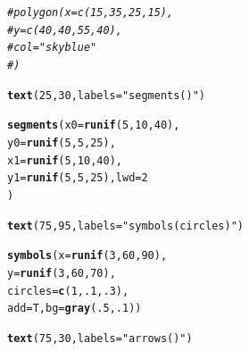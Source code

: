 \documentclass{tufte-book}\usepackage[]{graphicx}\usepackage[]{color}
\makeatletter
\newcommand{\hlnum}[1]{\textcolor[rgb]{0.686,0.059,0.569}{#1}}%
\newcommand{\hlstr}[1]{\textcolor[rgb]{0.192,0.494,0.8}{#1}}%
\newcommand{\hlcom}[1]{\textcolor[rgb]{0.678,0.584,0.686}{\textit{#1}}}%
\newcommand{\hlstd}[1]{\textcolor[rgb]{0.345,0.345,0.345}{#1}}%
\newcommand{\hlkwc}[1]{\textcolor[rgb]{0.333,0.667,0.333}{#1}}%
\newcommand{\hlkwd}[1]{\textcolor[rgb]{0.737,0.353,0.396}{\textbf{#1}}}%
\newenvironment{kframe}{%
 \def\at@end@of@kframe{}%
 \ifinner\ifhmode%
  \def\at@end@of@kframe{\end{minipage}}%
  \begin{minipage}{\columnwidth}%
 \fi\fi%
 \def\FrameCommand##1{\hskip\@totalleftmargin \hskip-\fboxsep
 \colorbox{shadecolor}{##1}\hskip-\fboxsep
     \hskip-\linewidth \hskip-\@totalleftmargin \hskip\columnwidth}%
 \MakeFramed {\advance\hsize-\width
   \@totalleftmargin\z@ \linewidth\hsize
   \@setminipage}}%
 {\par\unskip\endMakeFramed%
 \at@end@of@kframe}
\newenvironment{knitrout}{}{} %
\makeatother
\begin{document}
\begin{footnotesize}
\begin{marginfigure}
\begin{tiny}
\begin{knitrout}
\begin{kframe}
\begin{alltt}
\hlcom{# polygon(x = c(15, 35, 25, 15),}
\hlcom{#         y = c(40, 40, 55, 40),}
\hlcom{#         col = "skyblue"}
\hlcom{#         )}

\hlkwd{text}\hlstd{(}\hlnum{25}\hlstd{,} \hlnum{30}\hlstd{,} \hlkwc{labels} \hlstd{=} \hlstr{"segments()"}\hlstd{)}

\hlkwd{segments}\hlstd{(}\hlkwc{x0} \hlstd{=} \hlkwd{runif}\hlstd{(}\hlnum{5}\hlstd{,} \hlnum{10}\hlstd{,} \hlnum{40}\hlstd{),}
         \hlkwc{y0} \hlstd{=} \hlkwd{runif}\hlstd{(}\hlnum{5}\hlstd{,} \hlnum{5}\hlstd{,} \hlnum{25}\hlstd{),}
         \hlkwc{x1} \hlstd{=} \hlkwd{runif}\hlstd{(}\hlnum{5}\hlstd{,} \hlnum{10}\hlstd{,} \hlnum{40}\hlstd{),}
         \hlkwc{y1} \hlstd{=} \hlkwd{runif}\hlstd{(}\hlnum{5}\hlstd{,} \hlnum{5}\hlstd{,} \hlnum{25}\hlstd{),} \hlkwc{lwd} \hlstd{=} \hlnum{2}
         \hlstd{)}

\hlkwd{text}\hlstd{(}\hlnum{75}\hlstd{,} \hlnum{95}\hlstd{,} \hlkwc{labels} \hlstd{=} \hlstr{"symbols(circles)"}\hlstd{)}

\hlkwd{symbols}\hlstd{(}\hlkwc{x} \hlstd{=} \hlkwd{runif}\hlstd{(}\hlnum{3}\hlstd{,} \hlnum{60}\hlstd{,} \hlnum{90}\hlstd{),}
        \hlkwc{y} \hlstd{=} \hlkwd{runif}\hlstd{(}\hlnum{3}\hlstd{,} \hlnum{60}\hlstd{,} \hlnum{70}\hlstd{),}
        \hlkwc{circles} \hlstd{=} \hlkwd{c}\hlstd{(}\hlnum{1}\hlstd{,} \hlnum{.1}\hlstd{,} \hlnum{.3}\hlstd{),}
        \hlkwc{add} \hlstd{= T,} \hlkwc{bg} \hlstd{=} \hlkwd{gray}\hlstd{(}\hlnum{.5}\hlstd{,} \hlnum{.1}\hlstd{))}

\hlkwd{text}\hlstd{(}\hlnum{75}\hlstd{,} \hlnum{30}\hlstd{,} \hlkwc{labels} \hlstd{=} \hlstr{"arrows()"}\hlstd{)}


\end{alltt}
\end{kframe}
\end{knitrout}
\end{tiny}
\end{marginfigure}
\end{footnotesize}
\end{document}
